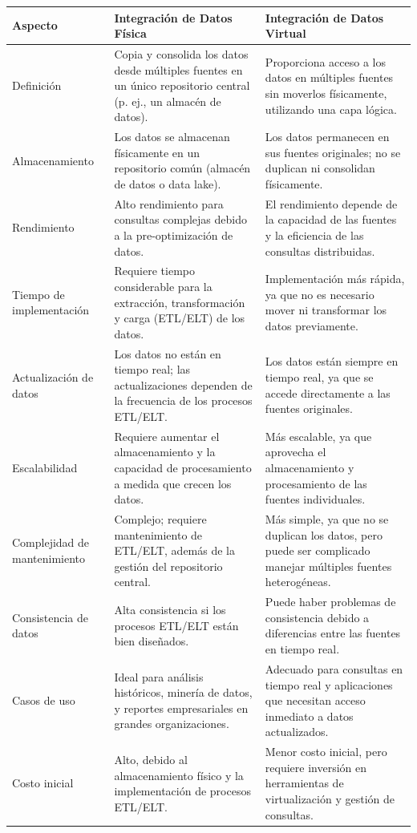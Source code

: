 \begin{longtable}{|p{3cm}|p{4.5cm}|p{4.5cm}|}
    \hline
    \textbf{Aspecto} & \textbf{Integración de Datos Física} & \textbf{Integración de Datos Virtual} \\
    \hline
    Definición & Copia y consolida los datos desde múltiples fuentes en un único repositorio central (p. ej., un almacén de datos). & Proporciona acceso a los datos en múltiples fuentes sin moverlos físicamente, utilizando una capa lógica. \\
    \hline
    Almacenamiento & Los datos se almacenan físicamente en un repositorio común (almacén de datos o data lake). & Los datos permanecen en sus fuentes originales; no se duplican ni consolidan físicamente. \\
    \hline
    Rendimiento & Alto rendimiento para consultas complejas debido a la pre-optimización de datos. & El rendimiento depende de la capacidad de las fuentes y la eficiencia de las consultas distribuidas. \\
    \hline
    Tiempo de implementación & Requiere tiempo considerable para la extracción, transformación y carga (ETL/ELT) de los datos. & Implementación más rápida, ya que no es necesario mover ni transformar los datos previamente. \\
    \hline
    Actualización de datos & Los datos no están en tiempo real; las actualizaciones dependen de la frecuencia de los procesos ETL/ELT. & Los datos están siempre en tiempo real, ya que se accede directamente a las fuentes originales. \\
    \hline
    Escalabilidad & Requiere aumentar el almacenamiento y la capacidad de procesamiento a medida que crecen los datos. & Más escalable, ya que aprovecha el almacenamiento y procesamiento de las fuentes individuales. \\
    \hline
    Complejidad de mantenimiento & Complejo; requiere mantenimiento de ETL/ELT, además de la gestión del repositorio central. & Más simple, ya que no se duplican los datos, pero puede ser complicado manejar múltiples fuentes heterogéneas. \\
    \hline
    Consistencia de datos & Alta consistencia si los procesos ETL/ELT están bien diseñados. & Puede haber problemas de consistencia debido a diferencias entre las fuentes en tiempo real. \\
    \hline
    Casos de uso & Ideal para análisis históricos, minería de datos, y reportes empresariales en grandes organizaciones. & Adecuado para consultas en tiempo real y aplicaciones que necesitan acceso inmediato a datos actualizados. \\
    \hline
    Costo inicial & Alto, debido al almacenamiento físico y la implementación de procesos ETL/ELT. & Menor costo inicial, pero requiere inversión en herramientas de virtualización y gestión de consultas. \\
    \hline
    \end{longtable}




